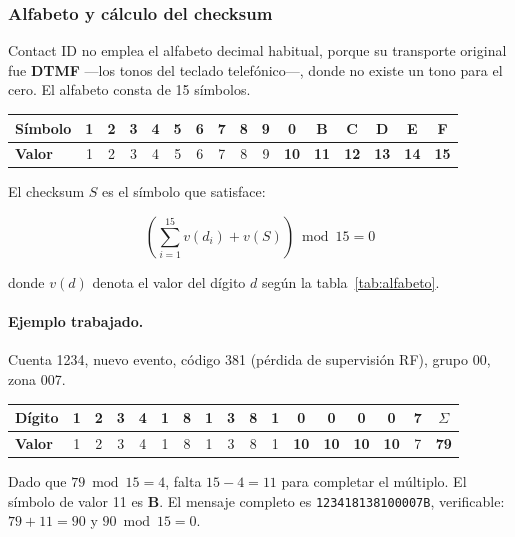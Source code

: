 \subsubsection{Alfabeto y cálculo del checksum}

Contact ID no emplea el alfabeto decimal habitual, porque su transporte original fue \textbf{DTMF} ---los
tonos del teclado telefónico---, donde no existe un tono para el cero. El alfabeto consta de 15 símbolos.

\begin{center}
\begin{tabular}{@{}l|ccccccccc|c|ccccc@{}}
\textbf{Símbolo} & 1 & 2 & 3 & 4 & 5 & 6 & 7 & 8 & 9 & \textbf{0} & \textbf{B} & \textbf{C} & \textbf{D} & \textbf{E} & \textbf{F} \\
\midrule
\textbf{Valor} & 1 & 2 & 3 & 4 & 5 & 6 & 7 & 8 & 9 & \textbf{10} & \textbf{11} & \textbf{12} & \textbf{13} & \textbf{14} & \textbf{15} \\
\end{tabular}
\label{tab:alfabeto}
\end{center}

El checksum $S$ es el símbolo que satisface:

\begin{equation}
\left(\sum_{i=1}^{15} v(d_i) + v(S)\right) \bmod 15 = 0
\end{equation}

donde $v(d)$ denota el valor del dígito $d$ según la tabla~\ref{tab:alfabeto}.

\paragraph{Ejemplo trabajado.} Cuenta 1234, nuevo evento, código 381 (pérdida de supervisión RF), grupo
00, zona 007.

\begin{center}
\begin{tabular}{@{}l|ccccccccccccccc|c@{}}
\textbf{Dígito} & 1 & 2 & 3 & 4 & 1 & 8 & 1 & 3 & 8 & 1 & 0 & 0 & 0 & 0 & 7 & $\Sigma$ \\
\midrule
\textbf{Valor} & 1 & 2 & 3 & 4 & 1 & 8 & 1 & 3 & 8 & 1 & \textbf{10} & \textbf{10} & \textbf{10} & \textbf{10} & 7 & \textbf{79} \\
\end{tabular}
\end{center}

Dado que $79 \bmod 15 = 4$, falta $15 - 4 = 11$ para completar el múltiplo. El símbolo de valor 11 es
\textbf{B}. El mensaje completo es \texttt{123418138100007B}, verificable: $79 + 11 = 90$ y
$90 \bmod 15 = 0$.


